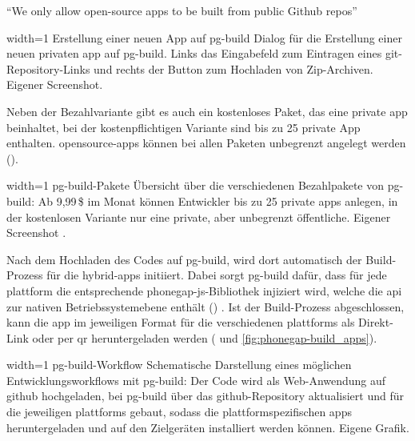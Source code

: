 {\begin{quoting}
\enquote{We only allow open-source apps to be built from public Github repos}~\cite{PhoneGap_Build_Apps}
\end{quoting}


	{width=1\textwidth}
	{Erstellung einer neuen App auf \gls{pg-build}}
		{Dialog für die Erstellung einer neuen privaten \gls{app} auf \gls{pg-build}. Links das Eingabefeld zum Eintragen eines \gls{git}-Repository-Links und rechts der Button zum Hochladen von Zip-Archiven.}
	{Eigener Screenshot.}

Neben der Bezahlvariante gibt es auch ein kostenloses Paket, das eine private \gls{app} beinhaltet, bei der kostenpflichtigen Variante sind bis zu 25 private App enthalten.
\gls{opensource}-\glspl{app} können bei allen Paketen unbegrenzt angelegt werden ().

	{width=1\textwidth}
	{\gls{pg-build}-Pakete}
		{Übersicht über die verschiedenen Bezahlpakete von \gls{pg-build}: Ab 9,99\,\$ im Monat können Entwickler bis zu 25 private \glspl{app} anlegen, in der kostenlosen Variante nur eine private, aber unbegrenzt öffentliche.}
	{Eigener Screenshot \cite{Adobe_PhoneGap_Build_Plans}.}

Nach dem Hochladen des Codes auf \gls{pg-build}, wird dort automatisch der Build-Prozess für die \glspl{hybrid-app} initiiert.
Dabei sorgt \gls{pg-build} dafür, dass für jede \gls{plattform} die entsprechende \gls{phonegap}-\gls{js}-Bibliothek injiziert wird, welche die \gls{api} zur nativen Betriebssystemebene enthält () \cite{PhoneGap_Build_Documentation_getting-started}.
Ist der Build-Prozess abgeschlossen, kann die \gls{app} im jeweiligen Format für die verschiedenen \glspl{plattform} als Direkt-Link oder per \gls{qr} heruntergeladen werden ( und \ref{fig:phonegap-build_apps}).

	{width=1\textwidth}
	{\gls{pg-build}-Workflow}
		{Schematische Darstellung eines möglichen Entwicklungsworkflows mit \gls{pg-build}: Der Code wird als Web-Anwendung auf \gls{github} hochgeladen, bei \gls{pg-build} über das \gls{github}-Repository aktualisiert und für die jeweiligen \glspl{plattform} gebaut, sodass die plattformspezifischen \glspl{app} heruntergeladen und auf den Zielgeräten installiert werden können.}
	{Eigene Grafik.}


}
